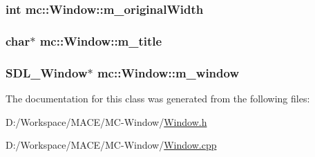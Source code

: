 \subsubsection[{\texorpdfstring{m\+\_\+original\+Width}{m_originalWidth}}]{\setlength{\rightskip}{0pt plus 5cm}int mc\+::\+Window\+::m\+\_\+original\+Width\hspace{0.3cm}{\ttfamily [protected]}}\hypertarget{classmc_1_1_window_a1f4c4744822006d438a532282d2b36c5}{}\label{classmc_1_1_window_a1f4c4744822006d438a532282d2b36c5}
\subsubsection[{\texorpdfstring{m\+\_\+title}{m_title}}]{\setlength{\rightskip}{0pt plus 5cm}char$\ast$ mc\+::\+Window\+::m\+\_\+title\hspace{0.3cm}{\ttfamily [protected]}}\hypertarget{classmc_1_1_window_a27f0a568dfe2d21915debc0672dd072e}{}\label{classmc_1_1_window_a27f0a568dfe2d21915debc0672dd072e}
\subsubsection[{\texorpdfstring{m\+\_\+window}{m_window}}]{\setlength{\rightskip}{0pt plus 5cm}S\+D\+L\+\_\+\+Window$\ast$ mc\+::\+Window\+::m\+\_\+window\hspace{0.3cm}{\ttfamily [protected]}}\hypertarget{classmc_1_1_window_a8df84ee7c278f016ef13ac0ede008f7c}{}\label{classmc_1_1_window_a8df84ee7c278f016ef13ac0ede008f7c}


The documentation for this class was generated from the following files\+:\begin{DoxyCompactItemize}
\item 
D\+:/\+Workspace/\+M\+A\+C\+E/\+M\+C-\/\+Window/\hyperlink{_window_8h}{Window.\+h}\item 
D\+:/\+Workspace/\+M\+A\+C\+E/\+M\+C-\/\+Window/\hyperlink{_window_8cpp}{Window.\+cpp}\end{DoxyCompactItemize}

